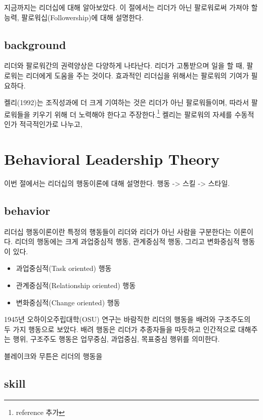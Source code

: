 지금까지는 리더십에 대해 알아보았다. 이 절에서는 리더가 아닌 팔로워로써 가져야
할 능력, 팔로워십(Followership)에 대해 설명한다. 

\subsection*{background}
리더와 팔로워간의 권력양상은 다양하게 나타난다. 리더가 고통받으며 일을 할 때,
팔로워는 리더에게 도움을 주는 것이다. 효과적인 리더십을 위해서는 팔로워의 기여가
필요하다.

켈리(1992)는 조직성과에 더 크게 기여하는 것은 리더가 아닌 팔로워들이며, 따라서
팔로워들을 키우기 위해 더 노력해야 한다고 주장한다.\footnote{reference 추가}
켈리는 팔로워의 자세를 수동적인가 적극적인가로 나누고, 

\newpage
\section{Behavioral Leadership Theory}

이번 절에서는 리더십의 행동이론에 대해 설명한다. 행동 -> 스킬 -> 스타일.

\subsection*{behavior}

리더십 행동이론이란 특정의 행동들이 리더와 리더가 아닌 사람을 구분한다는 이론이다. 리더의 행동에는 크게 
과업중심적 행동, 관계중심적 행동, 그리고 변화중심적 행동이 있다.
\begin{itemize}
  \item 과업중심적(Task oriented) 행동
  \item 관계중심적(Relationship oriented) 행동
  \item 변화중심적(Change oriented) 행동
\end{itemize}

1945년 오하이오주립대학(OSU) 연구는 바람직한 리더의 행동을 배려와 구조주도의 두
가지 행동으로 보았다. 배려 행동은 리더가 추종자들을 따듯하고 인간적으로 대해주는
행위, 구조주도 행동은 업무중심, 과업중심, 목표중심 행위를 의미한다.

블레이크와 무튼은 리더의 행동을 

\subsection*{skill}

